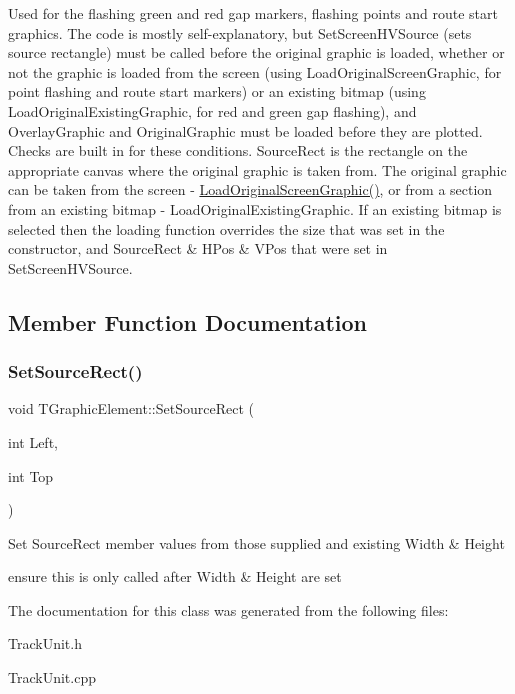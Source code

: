 Used for the flashing green and red gap markers, flashing points and route start graphics. The code is mostly self-\/explanatory, but Set\+Screen\+H\+V\+Source (sets source rectangle) must be called before the original graphic is loaded, whether or not the graphic is loaded from the screen (using Load\+Original\+Screen\+Graphic, for point flashing and route start markers) or an existing bitmap (using Load\+Original\+Existing\+Graphic, for red and green gap flashing), and Overlay\+Graphic and Original\+Graphic must be loaded before they are plotted. Checks are built in for these conditions. Source\+Rect is the rectangle on the appropriate canvas where the original graphic is taken from. The original graphic can be taken from the screen -\/ \mbox{\hyperlink{class_t_graphic_element_ac12f60cb52eefdc86eaa504419eb138d}{Load\+Original\+Screen\+Graphic()}}, or from a section from an existing bitmap -\/ Load\+Original\+Existing\+Graphic. If an existing bitmap is selected then the loading function overrides the size that was set in the constructor, and Source\+Rect \& H\+Pos \& V\+Pos that were set in Set\+Screen\+H\+V\+Source. 

\subsection{Member Function Documentation}
\mbox{\label{class_t_graphic_element_adffdc9f9c4a5fff5cbeab6b5a027dad9}} 
\subsubsection{\texorpdfstring{Set\+Source\+Rect()}{SetSourceRect()}}
{\footnotesize\ttfamily void T\+Graphic\+Element\+::\+Set\+Source\+Rect (\begin{DoxyParamCaption}\item[{int}]{Left,  }\item[{int}]{Top }\end{DoxyParamCaption})\hspace{0.3cm}{\ttfamily [inline]}}

Set Source\+Rect member values from those supplied and existing Width \& Height


\begin{DoxyItemize}
\item ensure this is only called after Width \& Height are set 
\end{DoxyItemize}

The documentation for this class was generated from the following files\+:\begin{DoxyCompactItemize}
\item 
Track\+Unit.\+h\item 
Track\+Unit.\+cpp\end{DoxyCompactItemize}
